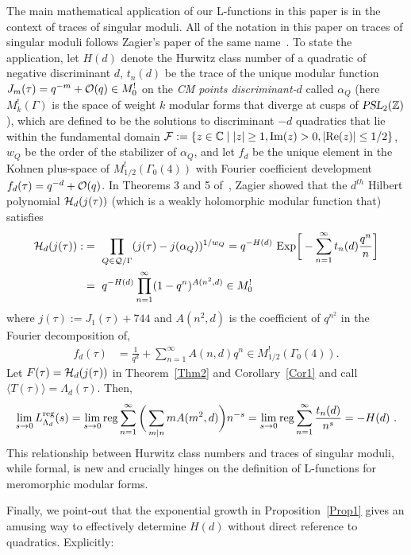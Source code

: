 \documentclass[11pt,a4paper]{article}
\newcommand{\G}{\Gamma}
\newcommand{\A}{\alpha}
\def\C{\mathbb{C}}
\def\Z{\mathbb{Z}}
\newcommand{\PSL}{\operatorname{\textsl{PSL}}}	%
\newcommand{\reg}{{\rm reg}}
\begin{document}
The main mathematical application of our L-functions in this paper is in the context of traces of singular moduli. All of the notation in this paper on traces of singular moduli follows Zagier's paper of the same name~\cite{02-TSM}. To state the application, let $H(d)$ denote the Hurwitz class number of a quadratic of negative discriminant $d$, $t_n(d)$ be the trace of the unique modular function $J_m(\tau) = q^{-m} + {\cal O}(q) \in M_0^!$ on the {\em CM points discriminant-$d$} called $\A_Q$ (here $M_k^!(\G)$ is the space of weight $k$ modular forms that diverge at cusps of $\PSL_2(\Z)$), which are defined to be the solutions to discriminant $-d$ quadratics that lie within the fundamental domain ${\cal F} := \{ z \in \C \mid |z| \geq 1, {\rm Im}(z) > 0, |{\rm Re}(z)| \leq 1/2\} $, $w_Q$ be the order of the stabilizer of $\alpha_Q$, and let $f_d$ be the unique element in the Kohnen plus-space of $M_{1/2}^!(\G_0(4))$ with Fourier coefficient development  $f_d(\tau)= q^{-d} + {\cal O}(q)$. In Theorems 3 and 5 of~\cite{02-TSM}, Zagier showed that the $d^{th}$ Hilbert polynomial ${\cal H}_d(j(\tau))$ (which is a weakly holomorphic modular function that) satisfies
\begin{align}
{\cal H}_d(j(\tau)) 
:&= ~\prod_{Q \in {\cal Q}/\G} (j(\tau) - j(\alpha_Q))^{1/w_Q} \label{eqHd2}
= q^{-H(d)} ~ {\rm Exp}\bigg[ - \sum_{n = 1}^{\infty} t_n(d) \frac{q^n}{n} \bigg]  \\
&= ~q^{-H(d)} \prod_{n = 1}^{\infty} (1-q^n)^{A(n^2,d)} \in M_0^!
\end{align}
where $j(\tau) := J_1(\tau) + 744$ and $A(n^2,d)$ is the coefficient of $q^{n^2}$ in the Fourier decomposition of,
\begin{align}
f_d(\tau) &= \frac{1}{q^d} + \sum_{n = 1}^{\infty} A(n,d) q^n \in M_{1/2}^!(\G_0(4)).
\end{align}
Let $F(\tau) = {\cal H}_d(j(\tau))$ in Theorem~\ref{Thm2} and Corollary~\ref{Cor1} and call $\langle T (\tau) \rangle = \Lambda_d(\tau)$. Then,
\begin{align}
\lim_{s \to 0} L_{\Lambda_d}^\reg(s) = \lim_{s \to 0} \reg \sum_{n = 1}^{\infty} \bigg( \sum_{m|n} m A(m^2,d) \bigg) n^{-s} = \lim_{s \to 0} \reg \sum_{n = 1}^{\infty} \frac{t_n(d)}{n^s} = -H(d)~.
\end{align}
This relationship between Hurwitz class numbers and traces of singular moduli, while formal, is new and crucially hinges on the definition of L-functions for meromorphic modular forms.

Finally, we point-out that the exponential growth in Proposition~\ref{Prop1} gives an amusing way to effectively determine $H(d)$ without direct reference to quadratics. Explicitly:
\end{document}
